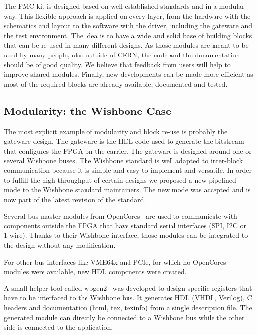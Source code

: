 \documentclass{JAC2003}
\begin{document}
The FMC kit is designed based on well-established standards and in a modular way.
This flexible approach is applied on every layer, from the hardware with the schematics and layout to the software with the driver, including the gateware and the test environment.
The idea is to have a wide and solid base of building blocks that can be re-used in many different designs.
As those modules are meant to be used by many people, also outside of CERN, the code and the documentation should be of good quality.
We believe that feedback from users will help to improve shared modules.
Finally, new developments can be made more efficient as most of the required blocks are already available, documented and tested.

\subsection{Modularity: the Wishbone Case}
The most explicit example of modularity and block re-use is probably the gateware design.
The gateware is the HDL code used to generate the bitstream that configures the FPGA on the carrier.
The gateware is designed around one or several Wishbone buses.
The Wishbone standard is well adapted to inter-block communication because it is simple and easy to implement and versatile.
In order to fulfill the high throughput of certain designs we proposed a new pipelined mode to the Wishbone standard maintainers. The new mode was accepted and is now part of the latest revision of the standard.

Several bus master modules from OpenCores~\cite{opencores} are used to communicate with components outside the FPGA that have standard serial interfaces (SPI, I2C or 1-wire).
Thanks to their Wishbone interface, those modules can be integrated to the design without any modification.

For other bus interfaces like VME64x and PCIe, for which no OpenCores modules were available, new HDL components were created.

A small helper tool called wbgen2~\cite{wbgen2} was developed to design specific registers that have to be interfaced to the Wishbone bus.
It generates HDL (VHDL, Verilog), C headers and documentation (html, tex, texinfo) from a single description file.
The generated module can directly be connected to a Wishbone bus while the other side is connected to the application.
\end{document}
